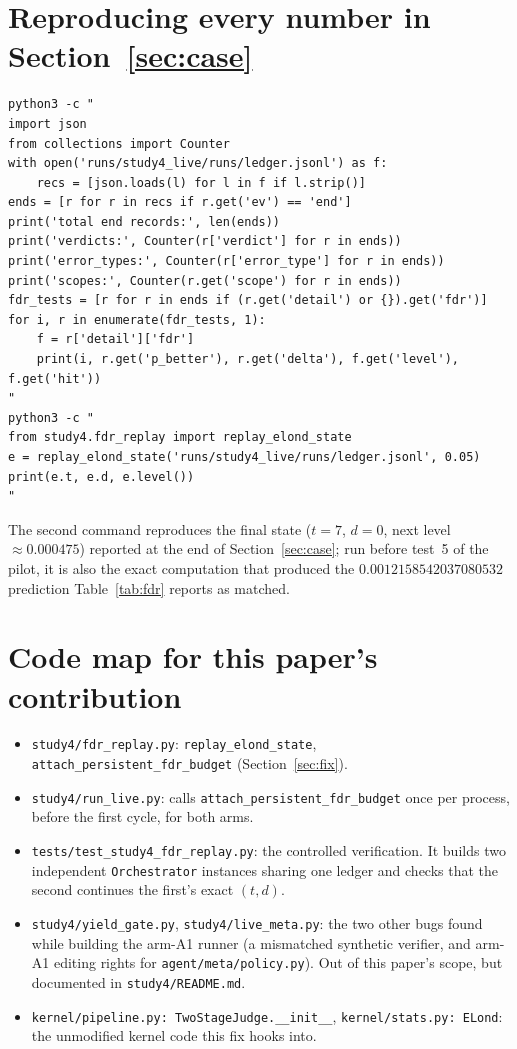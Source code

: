 \documentclass[11pt]{article}
\begin{document}



\appendix
\section{Reproducing every number in Section~\ref{sec:case}}
\label{app:repro}

\begin{verbatim}
python3 -c "
import json
from collections import Counter
with open('runs/study4_live/runs/ledger.jsonl') as f:
    recs = [json.loads(l) for l in f if l.strip()]
ends = [r for r in recs if r.get('ev') == 'end']
print('total end records:', len(ends))
print('verdicts:', Counter(r['verdict'] for r in ends))
print('error_types:', Counter(r['error_type'] for r in ends))
print('scopes:', Counter(r.get('scope') for r in ends))
fdr_tests = [r for r in ends if (r.get('detail') or {}).get('fdr')]
for i, r in enumerate(fdr_tests, 1):
    f = r['detail']['fdr']
    print(i, r.get('p_better'), r.get('delta'), f.get('level'), f.get('hit'))
"
python3 -c "
from study4.fdr_replay import replay_elond_state
e = replay_elond_state('runs/study4_live/runs/ledger.jsonl', 0.05)
print(e.t, e.d, e.level())
"
\end{verbatim}

The second command reproduces the final state ($t{=}7$, $d{=}0$, next level $\approx 0.000475$) reported at the end of Section~\ref{sec:case}; run before test~5 of the pilot, it is also the exact computation that produced the $0.0012158542037080532$ prediction Table~\ref{tab:fdr} reports as matched.

\section{Code map for this paper's contribution}
\label{app:code}

\begin{itemize}\setlength\itemsep{1pt}
\item \texttt{study4/fdr\_replay.py}: \texttt{replay\_elond\_state}, \texttt{attach\_persistent\_fdr\_budget} (Section~\ref{sec:fix}).
\item \texttt{study4/run\_live.py}: calls \texttt{attach\_persistent\_fdr\_budget} once per process, before the first cycle, for both arms.
\item \texttt{tests/}\allowbreak\texttt{test\_study4\_fdr\_replay.py}: the controlled verification. It builds two independent \texttt{Orchestrator} instances sharing one ledger and checks that the second continues the first's exact $(t,d)$.
\item \texttt{study4/yield\_gate.py}, \texttt{study4/live\_meta.py}: the two other bugs found while building the arm-A1 runner (a mismatched synthetic verifier, and arm-A1 editing rights for \texttt{agent/meta/}\allowbreak\texttt{policy.py}). Out of this paper's scope, but documented in \texttt{study4/}\allowbreak\texttt{README.md}.
\item \texttt{kernel/pipeline.py: TwoStageJudge.\_\_init\_\_}, \texttt{kernel/stats.py: ELond}: the unmodified kernel code this fix hooks into.
\end{itemize}
\end{document}
